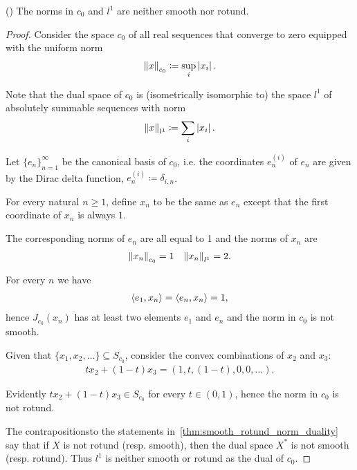\begin{example}\label{thm:c0_l1_not_smooth_rotund}(\cite[exercise 2.37(c)]{Phelps1993})
  The norms in $c_0$ and $l^1$ are neither smooth nor rotund.
\end{example}
\begin{proof}
  Consider the space $c_0$ of all real sequences that converge to zero equipped with the uniform norm
  \begin{align*}
    \left\Vert x \right\Vert_{c_0} \coloneqq \sup_i \left\vert x_i \right\vert.
  \end{align*}

  Note that the dual space of $c_0$ is (isometrically isomorphic to) the space $l^1$ of absolutely summable sequences with norm
  \begin{align*}
    \left\Vert x \right\Vert_{l^1} \coloneqq \sum_i \left\vert x_i \right\vert.
  \end{align*}

  Let $\{ e_n \}_{n=1}^\infty$ be the canonical basis of $c_0$, i.e. the coordinates $e^{(i)}_n$ of $e_n$ are given by the Dirac delta function, $e^{(i)}_n \coloneqq \delta_{i,n}$.

  For every natural $n \geq 1$, define $x_n$ to be the same as $e_n$ except that the first coordinate of $x_n$ is always $1$.

  The corresponding norms of $e_n$ are all equal to 1 and the norms of $x_n$ are
  \begin{align*}
    \left\Vert x_n \right\Vert_{c_0} = 1
    &&
    \left\Vert x_n \right\Vert_{l^1} = 2.
  \end{align*}

  For every $n$ we have
  \begin{align*}
    \left\langle e_1, x_n \right\rangle = \left\langle e_n, x_n \right\rangle = 1,
  \end{align*}
  hence $J_{c_0}(x_n)$ has at least two elements $e_1$ and $e_n$ and the norm in $c_0$ is not smooth.

  Given that $\{ x_1, x_2, \ldots \} \subseteq S_{c_0}$, consider the convex combinations of $x_2$ and $x_3$:
  \begin{align*}
    tx_2 + (1-t)x_3
    =
    (1, t, (1-t), 0, 0, \ldots).
  \end{align*}

  Evidently $tx_2 + (1-t)x_3 \in S_{c_0}$ for every $t \in (0, 1)$, hence the norm in $c_0$ is not rotund.

  The contrapositions\LEM to the statements in~\cref{thm:smooth_rotund_norm_duality} say that if $X$ is not rotund (resp. smooth), then the dual space $X^*$ is not smooth (resp. rotund). Thus $l^1$ is neither smooth or rotund as the dual of $c_0$.
\end{proof}
